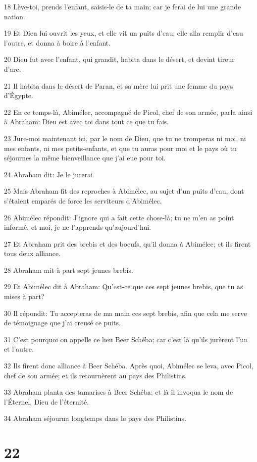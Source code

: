 \par 18 Lève-toi, prends l'enfant, saisis-le de ta main; car je ferai de lui une grande nation.
\par 19 Et Dieu lui ouvrit les yeux, et elle vit un puits d'eau; elle alla remplir d'eau l'outre, et donna à boire à l'enfant.
\par 20 Dieu fut avec l'enfant, qui grandit, habita dans le désert, et devint tireur d'arc.
\par 21 Il habita dans le désert de Paran, et sa mère lui prit une femme du pays d'Égypte.
\par 22 En ce temps-là, Abimélec, accompagné de Picol, chef de son armée, parla ainsi à Abraham: Dieu est avec toi dans tout ce que tu fais.
\par 23 Jure-moi maintenant ici, par le nom de Dieu, que tu ne tromperas ni moi, ni mes enfants, ni mes petits-enfants, et que tu auras pour moi et le pays où tu séjournes la même bienveillance que j'ai eue pour toi.
\par 24 Abraham dit: Je le jurerai.
\par 25 Mais Abraham fit des reproches à Abimélec, au sujet d'un puits d'eau, dont s'étaient emparés de force les serviteurs d'Abimélec.
\par 26 Abimélec répondit: J'ignore qui a fait cette chose-là; tu ne m'en as point informé, et moi, je ne l'apprends qu'aujourd'hui.
\par 27 Et Abraham prit des brebis et des boeufs, qu'il donna à Abimélec; et ils firent tous deux alliance.
\par 28 Abraham mit à part sept jeunes brebis.
\par 29 Et Abimélec dit à Abraham: Qu'est-ce que ces sept jeunes brebis, que tu as mises à part?
\par 30 Il répondit: Tu accepteras de ma main ces sept brebis, afin que cela me serve de témoignage que j'ai creusé ce puits.
\par 31 C'est pourquoi on appelle ce lieu Beer Schéba; car c'est là qu'ils jurèrent l'un et l'autre.
\par 32 Ils firent donc alliance à Beer Schéba. Après quoi, Abimélec se leva, avec Picol, chef de son armée; et ils retournèrent au pays des Philistins.
\par 33 Abraham planta des tamariscs à Beer Schéba; et là il invoqua le nom de l'Éternel, Dieu de l'éternité.
\par 34 Abraham séjourna longtemps dans le pays des Philistins.

\chapter{22}

